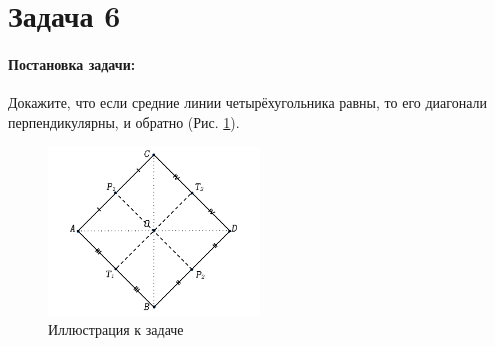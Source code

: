 {
   \section*{Задача 6}
   \paragraph{Постановка задачи:}
   Докажите, что если средние линии четырёхугольника равны,
   то его диагонали перпендикулярны, и обратно (Рис. \ref{t6:im}).
   \begin{figure}[h]
      \centering
      \includegraphics[width=0.5\textwidth]{images/task6.pdf}
      \caption{Иллюстрация к задаче}
      \label{t6:im}
   \end{figure}
}
